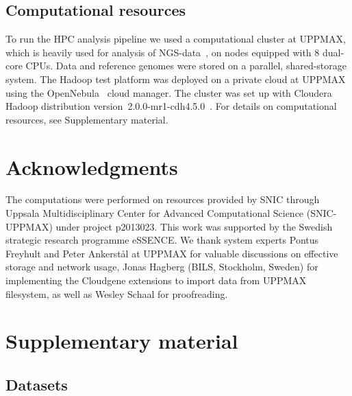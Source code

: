 \documentclass[10pt]{article}
\begin{document}
\subsection*{Computational resources}
To run the HPC analysis pipeline we used a computational cluster at UPPMAX, which is heavily used for analysis of NGS-data~\cite{lampa}, on nodes equipped with 8 dual-core CPUs. Data and reference genomes were stored on a parallel, shared-storage system. The Hadoop test platform was deployed on a private cloud at UPPMAX using the OpenNebula~\cite{opennebula} cloud manager. The cluster was set up with Cloudera Hadoop distribution version~2.0.0-mr1-cdh4.5.0~\cite{cloudera}. For details on computational resources, see Supplementary material.







\section*{Acknowledgments}
The computations were performed on resources provided by SNIC through Uppsala Multidisciplinary Center for Advanced Computational Science (SNIC-UPPMAX) under project p2013023. This work was supported by the Swedish strategic research programme eSSENCE.
We thank system experts Pontus Freyhult and Peter Ankerst{\aa}l at UPPMAX for valuable discussions on effective storage and network usage, Jonas Hagberg (BILS, Stockholm, Sweden) for implementing the Cloudgene extensions to import data from UPPMAX filesystem, as well as Wesley Schaal for proofreading.






\section*{Supplementary material}

\subsection*{Datasets}
\end{document}
